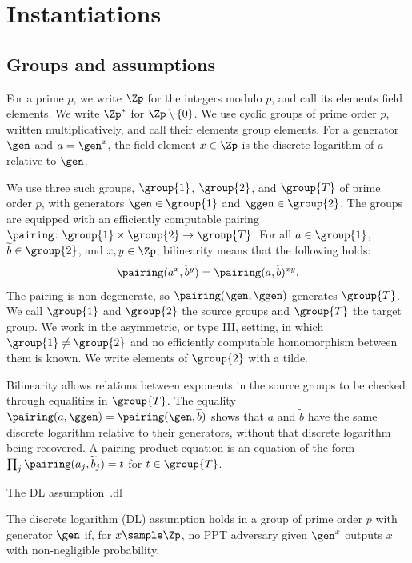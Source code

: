 \section{Instantiations}\label{sec:prelims-inst}

\subsection{Groups and assumptions}\label{sec:prelims-groups}

For a prime $p$, we write $\Zp$ for the integers modulo $p$, and call its
elements field elements. We write $\Zp^*$ for $\Zp \setminus \{0\}$. We use
cyclic groups of prime order $p$, written multiplicatively, and call their
elements group elements. For a generator $\gen$ and $a = \gen^x$, the field
element $x \in \Zp$ is the discrete logarithm of $a$ relative to $\gen$.

We use three such groups, $\group{1}$, $\group{2}$, and
$\group{T}$ of prime order $p$, with generators $\gen \in \group{1}$ and $\ggen
\in \group{2}$. The groups are equipped with an efficiently computable pairing
$\pairing \colon \group{1} \times \group{2} \rightarrow \group{T}$. For all $a
\in \group{1}$, $\widetilde{b} \in \group{2}$, and $x,y \in \Zp$, bilinearity
means that the following holds:
%
\begin{equation*}
%
  \pairing(a^x,\widetilde{b}^y) = \pairing(a,\widetilde{b})^{xy}.
%
\end{equation*}
%
The pairing is non-degenerate, so $\pairing(\gen,\ggen)$ generates $\group{T}$.
We call $\group{1}$ and $\group{2}$ the source groups and $\group{T}$ the target
group. We work in the asymmetric, or type III, setting, in which $\group{1} \neq
\group{2}$ and no efficiently computable homomorphism between them is known.
We write elements of $\group{2}$ with a tilde.

Bilinearity allows relations between exponents in the source groups to be
checked through equalities in $\group{T}$. The equality
$\pairing(a,\ggen) = \pairing(\gen,\widetilde{b})$ shows that $a$ and
$\widetilde{b}$ have the same discrete logarithm relative to their generators,
without that discrete logarithm being recovered. A pairing product equation is
an equation of the form $\prod_j \pairing(a_j, \widetilde{b}_j) = t$ for $t \in
\group{T}$.

\begin{assumptionbox}{The DL assumption~\cite{DifHel76}.}{dl}

  The discrete logarithm (DL) assumption holds in a group of prime order $p$ with generator $\gen$
if, for $x \sample \Zp$, no PPT adversary given $\gen^x$ outputs $x$ with
non-negligible probability.

\end{assumptionbox}

